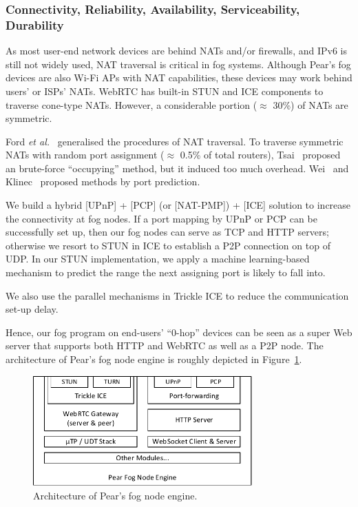 \subsubsection{Connectivity, Reliability, Availability, Serviceability, Durability}
As most user-end network devices are behind NATs and/or firewalls, and IPv6 is still not widely used, NAT traversal is critical in fog systems. 
Although Pear's fog devices are also Wi-Fi APs with NAT capabilities, these devices may work behind users' or ISPs' NATs. 
WebRTC has built-in STUN and ICE components to traverse cone-type NATs. However, a considerable portion ($\approx$ 30\%) of NATs are symmetric.  

Ford {\em et al.}~\cite{Ford:2005:PCA:1247360.1247373} generalised the procedures of NAT traversal. To traverse symmetric NATs with random port assignment ($\approx$ 0.5\% of total routers), Tsai~\cite{sqt2008} proposed an brute-force ``occupying'' method, but it induced too much overhead. Wei~\cite{wei2008new} and Klinec~\cite{Klinec:2014:TSN:2659651.2659698} proposed methods by port prediction. 

We build a hybrid [UPnP] + [PCP] (or [NAT-PMP]) + [ICE] solution to increase the connectivity at fog nodes. If a port mapping by UPnP or PCP can be successfully set up, then our fog nodes can serve as TCP and HTTP servers; otherwise we resort to STUN in ICE to establish a P2P connection on top of UDP. In our STUN implementation, we apply a machine learning-based mechanism to predict the range the next assigning port is likely to fall into. 

We also use the parallel mechanisms in Trickle ICE to reduce the communication set-up delay. 

Hence, our fog program on end-users' ``0-hop'' devices can be seen as a  super Web server that supports both HTTP and WebRTC as well as a P2P node. The architecture of Pear's fog node engine is roughly depicted in Figure~\ref{fig:pear-fog-node-engine}. 

\begin{figure}[ht]
	\centering
	\includegraphics[width=0.75\textwidth]{fig/decisions/pear-fog-node-engine.pdf} 
	\caption{Architecture of Pear's fog node engine.}\label{fig:pear-fog-node-engine}
\end{figure}

